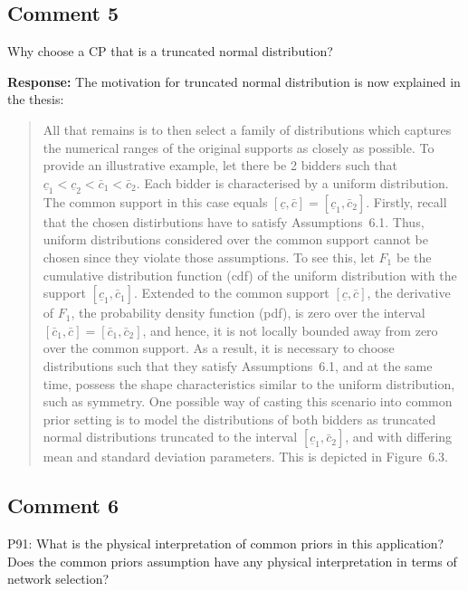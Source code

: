 \documentclass[10pt,a4paper,notitlepage]{article}
\numberwithin{equation}{section}
\begin{document}
\subsection{Comment 5}
Why choose a CP that is a truncated normal distribution?

\textbf{Response:}
The motivation for truncated normal distribution is now explained in the thesis:
\begin{quote}
All that remains is to then select a family of distributions which captures the numerical ranges of the original supports as closely as possible. To provide an illustrative example, let there be 2 bidders such that $\underline{c}_1 < \underline{c}_2 < \bar{c}_1 < \bar{c}_2$. Each bidder is characterised by a uniform distribution. The common support in this case equals $[\underline{c}, \bar{c}] = [\underline{c}_1, \bar{c}_2]$. Firstly, recall that the chosen distirbutions have to satisfy Assumptions~6.1. Thus, uniform distributions considered over the common support cannot be chosen since they violate those assumptions. To see this, let $F_1$ be the cumulative distribution function (cdf) of the uniform distribution with the support $[\underline{c}_1, \bar{c}_1]$. Extended to the common support $[\underline{c}, \bar{c}]$, the derivative of $F_1$, the probability density function (pdf), is zero over the interval $[\bar{c}_1, \bar{c}] = [\bar{c}_1, \bar{c}_2]$, and hence, it is not locally bounded away from zero over the common support. As a result, it is necessary to choose distributions such that they satisfy Assumptions~6.1, and at the same time, possess the shape characteristics similar to the uniform distribution, such as symmetry. One possible way of casting this scenario into common prior setting is to model the distributions of both bidders as truncated normal distributions truncated to the interval $[\underline{c}_1, \bar{c}_2]$, and with differing mean and standard deviation parameters. This is depicted in Figure~6.3.
\end{quote}

\subsection{Comment 6}
P91: What is the physical interpretation of common priors in this application? Does the common priors assumption have any physical interpretation in terms of network selection?
\end{document}
